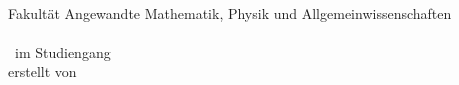 \thispagestyle{empty}
\begin{titlepage}
	\vspace*{-1cm}
	
	\begin{center}
		\\[1.5cm]
		
		{\LARGE Fakultät Angewandte Mathematik, Physik und Allgemeinwissenschaften}\\[1.5cm]
		
		{\huge\bfseries \titel}\\[1.5cm]
		
		{\Large \artderarbeit~im Studiengang \studiengang}\\[2cm]
		
		{\large erstellt von}\\[0.3cm]
		{\Large \autor}
	\end{center}
	
\end{titlepage}
